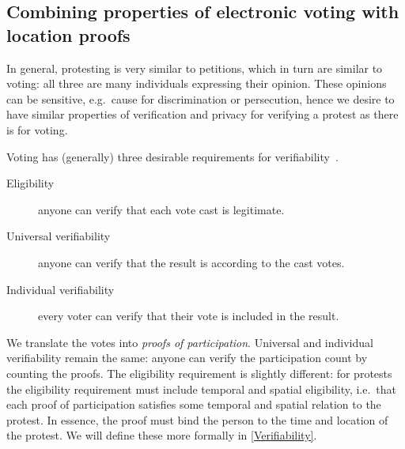 \subsection{Combining properties of electronic voting with location proofs}

In general, protesting is very similar to petitions, which in turn are similar 
to voting: all three are many individuals expressing their opinion.
These opinions can be sensitive, e.g.\ cause for discrimination or persecution, 
hence we desire to have similar properties of verification and privacy for 
verifying a protest as there is for voting.

Voting has (generally) three desirable requirements for 
verifiability~\cite{VerifyingPrivacyPropertiesOfVotingProtocols}.
\begin{description}
  \item[Eligibility] anyone can verify that each vote cast is legitimate.
  \item[Universal verifiability] anyone can verify that the result is according 
    to the cast votes.
  \item[Individual verifiability] every voter can verify that their vote is 
    included in the result.
\end{description}
We translate the votes into \emph{proofs of participation}.
Universal and individual verifiability remain the same: anyone can verify the 
participation count by counting the proofs.
The eligibility requirement is slightly different:
for protests the eligibility requirement must include temporal and spatial 
eligibility, i.e.\ that each proof of participation satisfies some temporal and 
spatial relation to the protest.
In essence, the proof must bind the person to the time and location of the 
protest.
We will define these more formally in \cref{Verifiability}.

